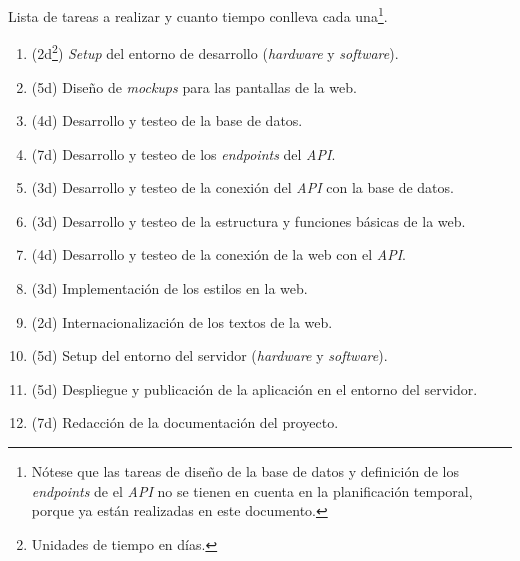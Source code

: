 \documentclass[12pt,a4paper,titlepage]{article}
\begin{document}

    Lista de tareas a realizar y cuanto tiempo conlleva cada una\footnote{Nótese que las tareas de diseño de la base de datos y definición de los \textit{endpoints} de el \textit{API} no se tienen en cuenta en la planificación temporal, porque ya están realizadas en este documento.}.

    \begin{enumerate}
        \renewcommand{\theenumi}{\Alph{enumi}} %
        \item (2d\footnote{Unidades de tiempo en días.}) \textit{Setup} del entorno de desarrollo (\textit{hardware} y \textit{software}).
        \item (5d) Diseño de \textit{mockups} para las pantallas de la web.
        \item (4d) Desarrollo y testeo de la base de datos.
        \item (7d) Desarrollo y testeo de los \textit{endpoints} del \textit{API}.
        \item (3d) Desarrollo y testeo de la conexión del \textit{API} con la base de datos.
        \item (3d) Desarrollo y testeo de la estructura y funciones básicas de la web.
        \item (4d) Desarrollo y testeo de la conexión de la web con el \textit{API}.
        \item (3d) Implementación de los estilos en la web.
        \item (2d) Internacionalización de los textos de la web.
        \item (5d) Setup del entorno del servidor (\textit{hardware} y \textit{software}).
        \item (5d) Despliegue y publicación de la aplicación en el entorno del servidor.
        \item (7d) Redacción de la documentación del proyecto.
    \end{enumerate}
\end{document}
